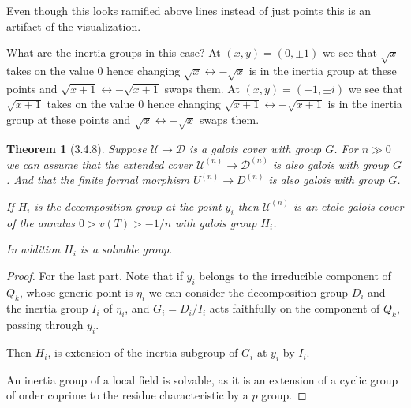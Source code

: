 \documentclass[oneside,12pt,]{article}
\newtheorem{theorem}{Theorem}
\newcommand{\gt}{>}
\begin{document}
Even though this looks ramified above lines instead of just points this is an artifact of the visualization.

What are the inertia groups in this case?
At $(x,y) = (0,\pm 1)$ we see that $\sqrt x$ takes on the value $0$ hence changing $\sqrt x \leftrightarrow -\sqrt x$ is in the inertia group at these points and $\sqrt{x+1}\leftrightarrow-\sqrt{x+1}$ swaps them.
At $(x,y) = (-1,\pm i)$ we see that $\sqrt {x+1}$ takes on the value $0$ hence changing $\sqrt {x+1}\leftrightarrow -\sqrt {x+1}$ is in the inertia group at these points and $\sqrt{x}\leftrightarrow-\sqrt{x}$ swaps them.






\begin{theorem}[3.4.8]
    Suppose $\mathscr U \to \mathscr D$ is a galois cover with group $G$. For $n \gg 0$ we can assume that the extended cover $\mathscr U^{(n)} \to \mathscr D^{(n)}$ is also galois with group $G$. And that the finite formal morphism $ U^{(n)} \to  D^{(n)}$ is also galois with group $G$.

    If $H_i$ is the decomposition group at the point $y_i$ then $\mathscr U^{(n)}$ is an etale galois cover of the annulus $0 \gt   v(T) \gt  -1/n$ with galois group $H_i$.

    In addition $H_i$ is a solvable group.
\end{theorem}

\begin{proof}
    For the last part. Note that if $y_i$ belongs to the irreducible component of $Q_k$, whose generic point is $\eta_i$ we can consider the decomposition group $D_i$ and the inertia group $I_i$ of $\eta_i$, and $G_i = D_i/ I_i$ acts faithfully on the component of $Q_k$, passing through $y_i$.

    Then $H_i$, is extension of the inertia subgroup of $G_i$ at $y_i$ by $I_i$.

    An inertia group of a local field is solvable, as it is an extension of a cyclic group of order coprime to the residue characteristic by a $p$ group.

\end{proof}
\end{document}
